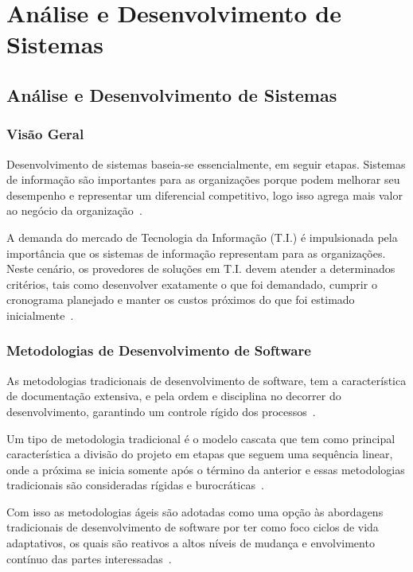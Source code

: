 \part{Análise e Desenvolvimento de Sistemas}\label{ParteII}

\chapter[Análise e Desenvolvimento de Sistemas]{Análise e Desenvolvimento de Sistemas}\label{Capitulo3}

\section{Visão Geral}

Desenvolvimento de sistemas baseia-se essencialmente, em seguir etapas.
Sistemas de informação são importantes para as organizações porque podem melhorar seu desempenho e representar um diferencial competitivo, logo isso agrega mais valor ao negócio da organização~\cite{alvarenga2016efeitos}.

A demanda do mercado de Tecnologia da Informação (T.I.) é impulsionada pela importância que os sistemas de informação representam para as organizações.
Neste cenário, os provedores de soluções em T.I. devem atender a determinados critérios, tais como desenvolver exatamente o que foi demandado, cumprir o cronograma planejado e manter os custos próximos do que foi estimado inicialmente~\cite{alvarenga2016efeitos}.

\section{Metodologias de Desenvolvimento de Software}

As metodologias tradicionais de desenvolvimento de software, tem a característica de documentação extensiva, e pela ordem e disciplina no decorrer do desenvolvimento, garantindo um controle rígido dos processos~\cite{baltzan2016tecnologia}.

Um tipo de metodologia tradicional é o modelo cascata que tem como principal característica a divisão do projeto em etapas que seguem uma sequência linear, onde a próxima se inicia somente após o término da anterior e essas metodologias tradicionais são consideradas rígidas e burocráticas~\cite{baltzan2016tecnologia}.

Com isso as metodologias ágeis são adotadas como uma opção às abordagens tradicionais de desenvolvimento de software por ter como foco ciclos de vida adaptativos, os quais são reativos a altos níveis de mudança e envolvimento contínuo das partes interessadas~\cite{vargas2014manual}.

